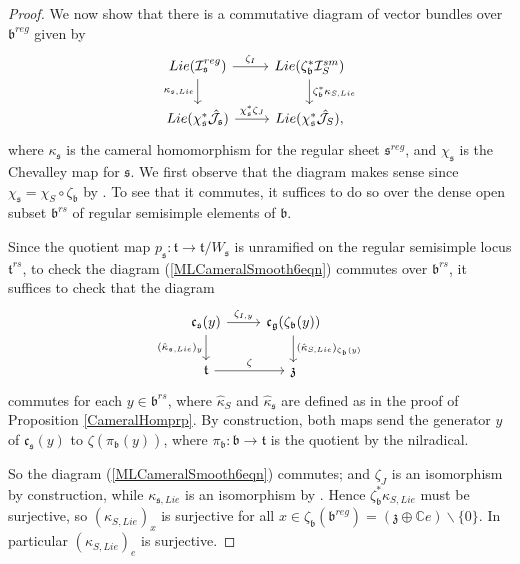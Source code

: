 \documentclass{amsart}
\theoremstyle{remark}
\numberwithin{theorem}{section}
\numberwithin{equation}{section}
\begin{document}
\begin{proof}
We now show that there is a commutative diagram of vector bundles over $\mathfrak{b}^{reg}$ given by 
\begin{equation}\label{MLCameralSmooth6eqn}
\begin{tikzcd}
Lie(\mathcal I_{\mathfrak{s}}^{reg}) \arrow[d, "{\kappa_{\mathfrak{s},Lie}}"'] \arrow[r, "\zeta_I"] & Lie(\zeta_{\mathfrak{b}}^*\mathcal I_S^{sm}) \arrow[d, "\zeta_{\mathfrak{b}}^*\kappa_{S, Lie}"] \\
Lie(\chi_{\mathfrak{s}}^*\hat{\mathcal J}_{\mathfrak{s}}) \arrow[r, "\chi_{\mathfrak{s}}^*\zeta_J"] & Lie( \chi_{\mathfrak{s}}^*\hat{\mathcal J_S}),                                                 
\end{tikzcd}
\end{equation}
where $\kappa_{\mathfrak{s}}$ is the cameral homomorphism for the regular sheet $\mathfrak{s}^{reg}$, and $\chi_{\mathfrak{s}}$ is the Chevalley map for $\mathfrak{s}$. We first observe that the diagram makes sense since $\chi_{\mathfrak{s}} = \chi_S \circ \zeta_{\mathfrak{b}}$ by \cite[Satz 5.6]{Borho2}. To see that it commutes, it suffices to do so over the dense open subset $\mathfrak{b}^{rs}$ of regular semisimple elements of $\mathfrak{b}$.

Since the quotient map $p_{\mathfrak{s}}:\mathfrak{t} \rightarrow \mathfrak{t}/W_{\mathfrak{s}}$ is unramified on the regular semisimple locus $\mathfrak{t}^{rs}$, to check the diagram (\ref{MLCameralSmooth6eqn}) commutes over $\mathfrak{b}^{rs}$, it suffices to check that the diagram
\begin{equation}\label{MLCameralSmooth7eqn}
\begin{tikzcd}
\mathfrak{c}_{\mathfrak{s}}(y) \arrow[d, "{(\hat \kappa_{\mathfrak{s},Lie})_y}"'] \arrow[r, "{\zeta_{I,y}}"] &  \mathfrak{c}_{\mathfrak{g}}(\zeta_{\mathfrak{b}}(y)) \arrow[d, "(\hat\kappa_{S, Lie})_{\zeta_{\mathfrak{b}}(y)}"] \\
\mathfrak{t} \arrow[r, "\zeta"]                                                                                                        & \mathfrak{z}                                                                                                               
\end{tikzcd}
\end{equation}
commutes for each $y \in \mathfrak{b}^{rs}$, where $\hat{\kappa}_S$ and $\hat{\kappa}_{\mathfrak{s}}$ are defined as in the proof of Proposition \ref{CameralHomprp}.  By construction, both maps send the generator $y$ of $\mathfrak{c}_{\mathfrak{s}}(y)$ to $\zeta(\pi_{\mathfrak{b}}(y))$, where $\pi_{\mathfrak{b}}:\mathfrak{b} \rightarrow \mathfrak{t}$ is the quotient by the nilradical.

So the diagram (\ref{MLCameralSmooth6eqn}) commutes; and $\zeta_J$ is an isomorphism by construction, while $\kappa_{\mathfrak{s},Lie}$ is an isomorphism by \cite[Proposition 12.5]{DG}. Hence $\zeta_{\mathfrak{b}}^*\kappa_{S, Lie}$ must be surjective, so $(\kappa_{S,Lie})_x$ is surjective for all $x \in \zeta_{\mathfrak{b}}(\mathfrak{b}^{reg}) =(\mathfrak{z} \oplus \mathbb{C}e)\backslash\{0\}$. In particular $(\kappa_{S,Lie})_e$ is surjective.
\end{proof}
\end{document}
